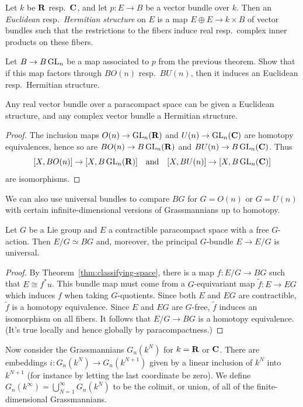 \documentclass[a4paper,openany]{scrbook}
\begin{document}
Let $k$ be $\mathbf R$ resp.\ $\mathbf C$, and let $p\colon E \to B$ be a vector bundle over $k$. Then an \textit{Euclidean} resp.\ \textit{Hermitian structure} on $E$ is a map $E \oplus E \to k \times B$ of vector bundles such that the restrictions to the fibers induce real resp.\ complex inner products on these fibers.
\begin{exer}
Let $B \to B \operatorname{GL}_n$ be a map associated to $p$ from the previous theorem. Show that if this map factors through $B O(n)$ resp.\ $BU(n)$, then it induces an Euclidean resp.\ Hermitian structure.
\end{exer}	
\begin{corollary}\label{cor:euclideanstructure}
Any real vector bundle over a paracompact space can be given a Euclidean structure, and any complex vector bundle a Hermitian structure. 
\end{corollary}
\begin{proof}
The inclusion maps $O(n) \to \operatorname{GL}_n(\mathbf R)$ and $U(n) \to \operatorname{GL}_n(\mathbf C)$ are homotopy equivalences, hence so are $BO(n) \to B\operatorname{GL}_n(\mathbf R)$ and $BU(n) \to B\operatorname{GL}_n(\mathbf C)$. Thus
\[
[X,BO(n)] \to [X,B\operatorname{GL}_n(\mathbf R)] \quad \text{and} \quad [X,BU(n)] \to [X,B\operatorname{GL}_n(\mathbf C)]
\]
are isomorphisms.
\end{proof}

We can also use universal bundles to compare $BG$ for $G=O(n)$ or $G=U(n)$ with certain infinite-dimensional versions of Grassmannians up to homotopy.

\begin{corollary}\label{cor:characterizationfouniversalGspaces}
Let $G$ be a Lie group and $E$ a contractible paracompact space with a free $G$-action. Then $E/G \simeq BG$ and, moreover, the principal $G$-bundle $E \to E/G$ is universal.
\end{corollary}
\begin{proof}
By Theorem~\ref{thm:classifying-space}, there is a map $f\colon E/G \to BG$ such that $E \cong f^*u$. This bundle map must come from a $G$-equivariant map $\tilde f\colon E \to EG$ which induces $f$ when taking $G$-quotients. Since both $E$ and $EG$ are contractible, $\tilde f$ is a homotopy equivalence. Since $E$ and $EG$ are $G$-free, $\tilde f$ induces an isomorphism on all fibers. It follows that $E/G \to BG$ is a homotopy equivalence. (It's true locally and hence globally by paracompactness.)
\end{proof}

Now consider the Grassmannians $G_n(k^N)$ for $k=\mathbf R$ or $\mathbf C$. There are embeddings $i\colon G_n(k^N) \to G_n(k^{N+1})$ given by a linear inclusion of $k^N$ into $k^{N+1}$ (for instance by letting the last coordinate be zero). We define $G_n(k^\infty) = \bigcup_{N=1}^\infty G_n(k^N)$ to be the colimit, or union, of all of the finite-dimensional Grassmannians. 
\end{document}

